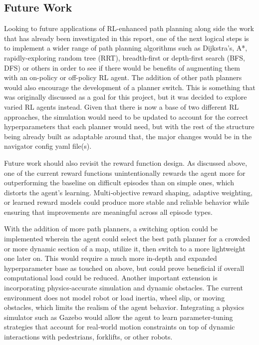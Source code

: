 \documentclass[conference]{IEEEtran}
\begin{document}
    \subsection{Future Work}
    Looking to future applications of RL-enhanced path planning along side the work that has already been investigated in this report, one of the next logical steps is to implement
    a wider range of path planning algorithms such as Dijkstra's, A*, rapidly-exploring random tree (RRT), breadth-first or depth-first search (BFS, DFS) or others in order to see if
    there would be benefits of augmenting them with an on-policy or off-policy RL agent. The addition of other path planners would also encourage the development of a planner switch.
    This is something that was originally discussed as a goal for this project, but it was decided to explore varied RL agents instead. Given that there is now a base of two different
    RL approaches, the simulation would need to be updated to account for the correct hyperparameters that each planner would need, but with the rest of the structure being already built
    as adaptable around that, the major changes would be in the navigator config yaml file(s).
    
    Future work should also revisit the reward function design. As discussed above, one of the current reward functions unintentionally rewards the agent more for outperforming the baseline on difficult episodes than on simple ones, which distorts the agent's learning. Multi‑objective reward shaping, adaptive weighting, or learned reward models could produce more
    stable and reliable behavior while ensuring that improvements are meaningful across all episode types.

    With the addition of more path planners, a switching option could be implemented wherein the agent could select the best path planner for a crowded or more dynamic section of a map, utilize it, then switch to a more lightweight one later on. This would require a much more in-depth and expanded hyperparameter base as touched on above, but could prove beneficial if overall computational load could be reduced. Another important extension is incorporating physics‑accurate simulation and dynamic obstacles. The current environment does not model robot or load inertia, wheel slip, or moving obstacles, which limits the realism of the agent behavior. Integrating a physics simulator such as Gazebo would allow the agent to learn parameter‑tuning strategies that account for real‑world motion constraints on top of dynamic interactions with pedestrians, forklifts, or other robots.
    
\end{document}
